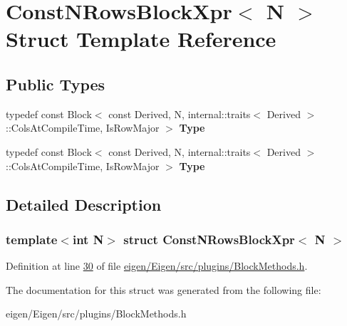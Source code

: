 \hypertarget{struct_const_n_rows_block_xpr}{}\section{Const\+N\+Rows\+Block\+Xpr$<$ N $>$ Struct Template Reference}
\label{struct_const_n_rows_block_xpr}
\subsection*{Public Types}
\begin{DoxyCompactItemize}
\item 
\mbox{\label{struct_const_n_rows_block_xpr_ae63ae688b42419e3dd3167c2f06864c5}} 
typedef const Block$<$ const Derived, N, internal\+::traits$<$ Derived $>$\+::Cols\+At\+Compile\+Time, Is\+Row\+Major $>$ {\bfseries Type}
\item 
\mbox{\label{struct_const_n_rows_block_xpr_ae63ae688b42419e3dd3167c2f06864c5}} 
typedef const Block$<$ const Derived, N, internal\+::traits$<$ Derived $>$\+::Cols\+At\+Compile\+Time, Is\+Row\+Major $>$ {\bfseries Type}
\end{DoxyCompactItemize}


\subsection{Detailed Description}
\subsubsection*{template$<$int N$>$\newline
struct Const\+N\+Rows\+Block\+Xpr$<$ N $>$}



Definition at line \hyperlink{eigen_2_eigen_2src_2plugins_2_block_methods_8h_source_l00030}{30} of file \hyperlink{eigen_2_eigen_2src_2plugins_2_block_methods_8h_source}{eigen/\+Eigen/src/plugins/\+Block\+Methods.\+h}.



The documentation for this struct was generated from the following file\+:\begin{DoxyCompactItemize}
\item 
eigen/\+Eigen/src/plugins/\+Block\+Methods.\+h\end{DoxyCompactItemize}

